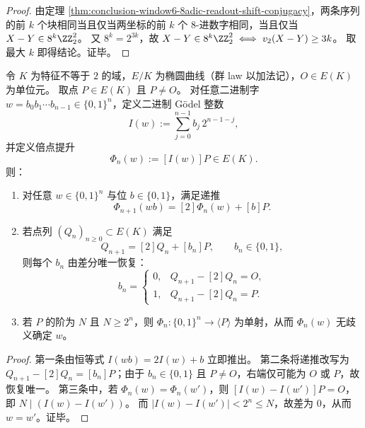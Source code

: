 \begin{proof}
由定理 \ref{thm:conclusion-window6-8adic-readout-shift-conjugacy}，两条序列的前 \(k\) 个块相同当且仅当两坐标的前 \(k\) 个 \(8\)-进数字相同，当且仅当 \(X-Y\in 8^k\ZZ_2^2\)。
又 \(8^k=2^{3k}\)，故 \(X-Y\in 8^k\ZZ_2^2\iff v_2(X-Y)\ge 3k\)。
取最大 \(k\) 即得结论。证毕。
\end{proof}

\begin{proposition}\label{prop:conclusion-binary-godel-elliptic-lift-reversible-readout}
令 \(K\) 为特征不等于 \(2\) 的域，\(E/K\) 为椭圆曲线（群 law 以加法记），\(O\in E(K)\) 为单位元。
取点 \(P\in E(K)\) 且 \(P\neq O\)。
对任意二进制字 \(w=b_0b_1\cdots b_{n-1}\in\{0,1\}^n\)，定义二进制 Gödel 整数
\[
I(w):=\sum_{j=0}^{n-1}b_j\,2^{n-1-j},
\]
并定义倍点提升
\[
\Phi_n(w):=[I(w)]P\in E(K).
\]
则：
\begin{enumerate}
  \item 对任意 \(w\in\{0,1\}^n\) 与位 \(b\in\{0,1\}\)，满足递推
  \[
  \Phi_{n+1}(wb)=[2]\Phi_n(w)+[b]P.
  \]
  \item 若点列 \((Q_n)_{n\ge 0}\subset E(K)\) 满足
  \[
  Q_{n+1}=[2]Q_n+[b_n]P,\qquad b_n\in\{0,1\},
  \]
  则每个 \(b_n\) 由差分唯一恢复：
  \[
  b_n=
  \begin{cases}
  0,& Q_{n+1}-[2]Q_n=O,\\
  1,& Q_{n+1}-[2]Q_n=P.
  \end{cases}
  \]
  \item 若 \(P\) 的阶为 \(N\) 且 \(N\ge 2^n\)，则 \(\Phi_n:\{0,1\}^n\to\langle P\rangle\) 为单射，从而 \(\Phi_n(w)\) 无歧义确定 \(w\)。
\end{enumerate}
\end{proposition}
\begin{proof}
第一条由恒等式 \(I(wb)=2I(w)+b\) 立即推出。
第二条将递推改写为 \(Q_{n+1}-[2]Q_n=[b_n]P\)；由于 \(b_n\in\{0,1\}\) 且 \(P\neq O\)，右端仅可能为 \(O\) 或 \(P\)，故恢复唯一。
第三条中，若 \(\Phi_n(w)=\Phi_n(w')\)，则 \([I(w)-I(w')]P=O\)，即 \(N\mid(I(w)-I(w'))\)。
而 \(|I(w)-I(w')|<2^n\le N\)，故差为 \(0\)，从而 \(w=w'\)。证毕。
\end{proof}

